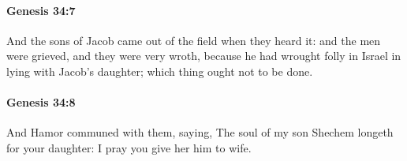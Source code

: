 		\paragraph{Genesis 34:7} %
			\label{GENESIS-34-7}

			And the sons of Jacob came out of the field when they heard it: and the men were grieved, and they were very wroth, because he had wrought folly in Israel in lying with Jacob's daughter; which thing ought not to be done.


		\paragraph{Genesis 34:8} %
			\label{GENESIS-34-8}

			And Hamor communed with them, saying, The soul of my son Shechem longeth for your daughter: I pray you give her him to wife.



